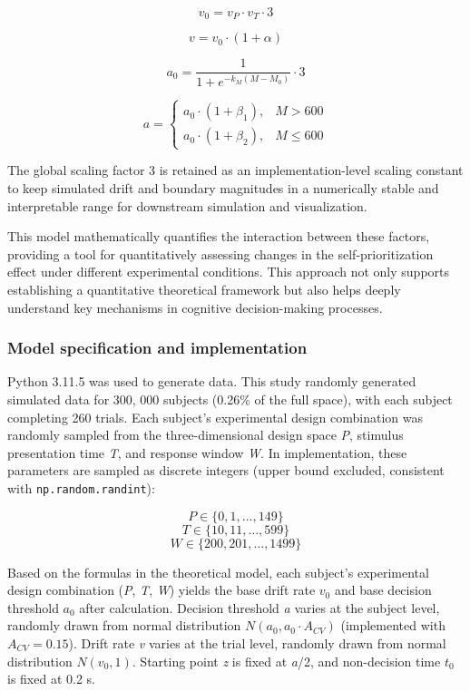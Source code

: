 \documentclass[
  english,
  man,floatsintext]{apa6}
\begin{document}
\[v_0 = v_P \cdot v_T \cdot 3\]

\[v = v_0 \cdot (1 + \alpha)\]

\[a_0 = \frac{1}{1 + e^{-k_M(M - M_0)}} \cdot 3\]

\[a =
\begin{cases}
a_0 \cdot (1 + \beta_1), & M > 600 \\
a_0 \cdot (1 + \beta_2), & M \leq 600
\end{cases}
\]

The global scaling factor 3 is retained as an implementation-level scaling constant to keep simulated drift and boundary magnitudes in a numerically stable and interpretable range for downstream simulation and visualization.

This model mathematically quantifies the interaction between these factors, providing a tool for quantitatively assessing changes in the self-prioritization effect under different experimental conditions. This approach not only supports establishing a quantitative theoretical framework but also helps deeply understand key mechanisms in cognitive decision-making processes.

\subsubsection{Model specification and implementation}\label{model-specification-and-implementation}

Python 3.11.5 was used to generate data. This study randomly generated simulated data for 300, 000 subjects (0.26\% of the full space), with each subject completing 260 trials. Each subject's experimental design combination was randomly sampled from the three-dimensional design space \emph{P}, stimulus presentation time \emph{T}, and response window \emph{W}. In implementation, these parameters are sampled as discrete integers (upper bound excluded, consistent with \texttt{np.random.randint}):

\[P \in \{0, 1, \dots, 149\}\]
\[T \in \{10, 11, \dots, 599\}\]
\[W \in \{200, 201, \dots, 1499\}\]

Based on the formulas in the theoretical model, each subject's experimental design combination (\emph{P}, \emph{T}, \emph{W}) yields the base drift rate \(v_0\) and base decision threshold \(a_0\) after calculation. Decision threshold \emph{a} varies at the subject level, randomly drawn from normal distribution \(N(a_0, a_0 \cdot A_{CV})\) (implemented with \(A_{CV}=0.15\)). Drift rate \emph{v} varies at the trial level, randomly drawn from normal distribution \(N(v_0, 1)\). Starting point \emph{z} is fixed at \emph{a}/2, and non-decision time \(t_0\) is fixed at 0.2 s.
\end{document}
